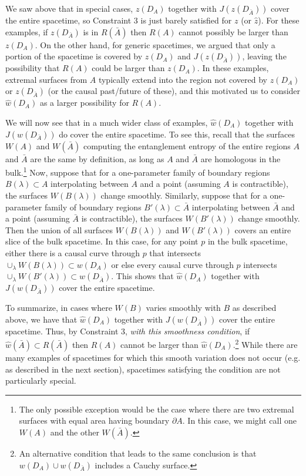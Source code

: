 \documentclass[12pt]{article}
\renewcommand{\(}{\left(}
\renewcommand{\)}{\right)}
\begin{document}
We saw above that in special cases, $z(D_A)$ together with $J(z(D_{\bar{A}}))$ cover the entire spacetime, so Constraint 3 is just barely satisfied for $z$ (or $\hat{z}$). For these examples, if $z(D_{\bar{A}})$ is in $R(\bar{A})$ then $R(A)$ cannot possibly be larger than $z(D_A)$. On the other hand, for generic spacetimes, we argued that only a portion of the spacetime is covered by $z(D_A)$ and  $J(z(D_{\bar{A}}))$, leaving the possibility that $R(A)$ could be larger than $z(D_A)$. In these examples, extremal surfaces from $A$ typically extend into the region not covered by $z(D_A)$ or $z(D_{\bar{A}})$ (or the causal past/future of these), and this motivated us to consider $\hat{w}(D_A)$ as a larger possibility for $R(A)$.

We will now see that in a much wider class of examples, $\hat{w}(D_A)$ together with $J(w(D_{\bar{A}}))$ do cover the entire spacetime. To see this, recall that the surfaces $W(A)$ and $W(\bar{A})$ computing the entanglement entropy of the entire regions $A$ and $\bar{A}$ are the same by definition, as long as $A$ and $\bar{A}$ are homologous in the bulk.\footnote{The only possible exception would be the case where there are two extremal surfaces with equal area having boundary $\partial A$. In this case, we might call one $W(A)$ and the other $W(\bar{A})$.} Now, suppose that for a one-parameter family of boundary regions $B(\lambda) \subset A$ interpolating between $A$ and a point (assuming $A$ is contractible),  the surfaces $W(B(\lambda))$ change smoothly. Similarly, suppose that for a one-parameter family of boundary regions $B'(\lambda) \subset \bar{A}$ interpolating between $\bar{A}$ and a point (assuming $\bar{A}$ is contractible),  the surfaces $W(B'(\lambda))$ change smoothly. Then the union of all surfaces $W(B(\lambda))$ and $W(B'(\lambda))$ covers an entire slice of the bulk spacetime. In this case, for any point $p$ in the bulk spacetime, either there is a causal curve through $p$ that intersects $\cup_\lambda W(B(\lambda)) \subset w(D_A)$ or else every causal curve through $p$ intersects $\cup_{\lambda} W(B'(\lambda)) \subset w(D_{\bar{A}})$. This shows that $\hat{w}(D_A)$ together with $J(w(D_{\bar{A}}))$ cover the entire spacetime.

To summarize, in cases where $W(B)$ varies smoothly with $B$ as described above, we have that $\hat{w}(D_A)$ together with $J(w(D_{\bar{A}}))$ cover the entire spacetime. Thus, by Constraint 3, {\it with this smoothness condition}, if $\hat{w}(\bar{A}) \subset R(\bar{A})$ then $R(A)$ cannot be larger than $\hat{w}(D_A)$.\footnote{An alternative condition that leads to the same conclusion is that $w(D_A) \cup w(D_{\bar{A}})$ includes a Cauchy surface.} While there are many examples of spacetimes for which this smooth variation does not occur (e.g. as described in the next section), spacetimes satisfying the condition are not particularly special.
\end{document}
